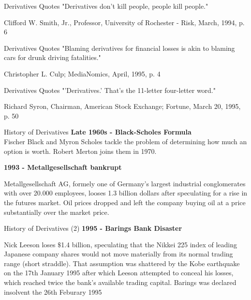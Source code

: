{Derivatives Quotes}
"Derivatives don't kill people, people kill people."
\begin{flushright}
  \begin{footnotesize}
 Clifford W. Smith, Jr., Professor, University of Rochester - Risk, March, 1994, p. 6
 \end{footnotesize}
\end{flushright}

{Derivatives Quotes}
"Blaming derivatives for financial losses is akin to blaming cars for drunk driving fatalities."
\begin{flushright}
  \begin{footnotesize}
 Christopher L. Culp; MediaNomics, April, 1995, p. 4
 \end{footnotesize}
\end{flushright}

{Derivatives Quotes}
"'Derivatives.' That's the 11-letter four-letter word."
\begin{flushright}
  \begin{footnotesize}
  Richard Syron, Chairman, American Stock Exchange; Fortune, March 20, 1995, p. 50
 \end{footnotesize}
\end{flushright}

{History of Derivatives}
\textbf{Late 1960s - Black-Scholes Formula}\\


	Fischer Black and Myron Scholes tackle the problem of determining how much an option is worth. Robert Merton joins them in 1970.


\textbf{1993 - Metallgesellschaft bankrupt}


	Metallgesellschaft AG, formely one of Germany's largest industrial conglomerates with over 20.000 employees, looses 1.3 billion dollars after speculating for a rise in the futures market. Oil prices dropped and left the company buying oil at a price substantially over the market price.


{History of Derivatives (2)}
\textbf{1995 - Barings Bank Disaster }


	Nick Leeson loses $\$$1.4 billion, speculating that the Nikkei 225 index of leading Japanese company shares would not move materially from its normal trading range (short straddle). That assumption was shattered by the Kobe earthquake on the 17th January 1995 after which Leeson attempted to conceal his losses, which reached twice the bank's available trading capital. Barings was declared insolvent the 26th Feburary 1995

